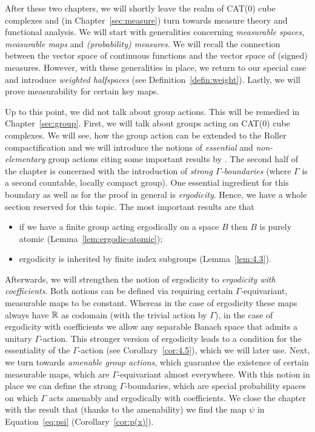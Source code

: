 After these two chapters, we will shortly leave the realm of CAT(0) cube complexes and (in Chapter~\ref{sec:measure}) turn towards measure theory and functional analysis. We will start with generalities concerning \emph{measurable spaces, measurable maps} and \emph{(probability) measures}. We will recall the connection between the vector space of continuous functions and the vector space of (signed) measures. However, with these generalities in place, we return to our special case and introduce \emph{weighted halfspaces} (see Definition~\ref{defin:weight}). Lastly, we will prove measurability for certain key maps. 

Up to this point, we did not talk about group actions. This will be remedied in Chapter~\ref{sec:group}. First, we will talk about groups acting on CAT(0) cube complexes. We will see, how the group action can be extended to the Roller compactification and we will introduce the notions of \emph{essential} and \emph{non-elementary} group actions citing some important results by \textcite{Caprace2010}. The second half of the chapter is concerned with the introduction of \emph{strong \(\Gamma\)-boundaries} (where \(\Gamma\) is a second countable, locally compact group). One essential ingredient for this boundary as well as for the proof in general is \emph{ergodicity}. Hence, we have a whole section reserved for this topic. The most important results are that
\begin{itemize}
\item if we have a finite group acting ergodically on a space \(B\) then \(B\) is purely atomic (Lemma~\ref{lem:ergodic-atomic});
\item ergodicity is inherited by finite index subgroups (Lemma~\ref{lem:4.3}).
\end{itemize}
Afterwards, we will strengthen the notion of ergodicity to \emph{ergodicity with coefficients}. Both notions can be defined via requiring certain \(\Gamma\)-equivariant, measurable maps to be constant. Whereas in the case of ergodicity these maps always have \(\mathbb{R}\) as codomain (with the trivial action by \(\Gamma\)), in the case of ergodicity with coefficients we allow any separable Banach space that admits a unitary \(\Gamma\)-action. This stronger version of ergodicity leads to a condition for the essentiality of the \(\Gamma\)-action (see Corollary~\ref{cor:4.5}), which we will later use. Next, we turn towards \emph{amenable group actions}, which guarantee the existence of certain measurable maps, which are \(\Gamma\)-equivariant almost everywhere. With this notion in place we can define the strong \(\Gamma\)-boundaries, which are special probability spaces on which \(\Gamma\) acts amenably and ergodically with coefficients. We close the chapter with the result that (thanks to the amenability) we find the map \(\psi\) in Equation~\eqref{eq:psi} (Corollary~\ref{cor:p(x)}).

